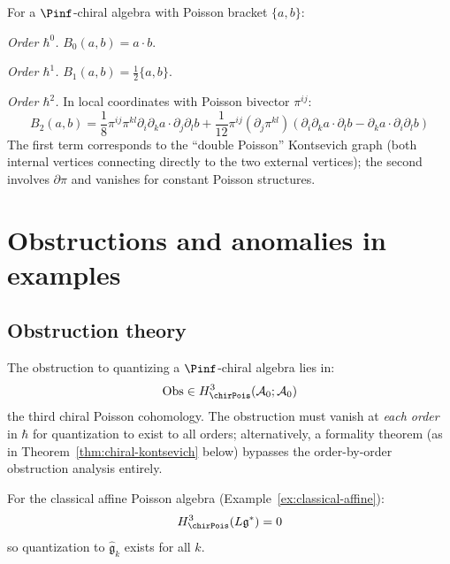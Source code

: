 \begin{computation}\label{comp:star-order-2}
For a $\Pinf$-chiral algebra with Poisson bracket $\{a, b\}$:

\emph{Order $\hbar^0$.} $B_0(a, b) = a \cdot b$.

\emph{Order $\hbar^1$.} $B_1(a, b) = \frac{1}{2}\{a, b\}$.

\emph{Order $\hbar^2$.}  In local coordinates with Poisson bivector $\pi^{ij}$:
\[
B_2(a, b) = \frac{1}{8}\pi^{ij}\pi^{kl}\partial_i\partial_k a \cdot \partial_j\partial_l b + \frac{1}{12}\pi^{ij}(\partial_j\pi^{kl})(\partial_i\partial_k a \cdot \partial_l b - \partial_k a \cdot \partial_i\partial_l b)
\]
The first term corresponds to the ``double Poisson'' Kontsevich graph (both internal vertices connecting directly to the two external vertices); the second involves $\partial\pi$ and vanishes for constant Poisson structures.
\end{computation}


\section{Obstructions and anomalies in examples}
\label{sec:obstructions}

\subsection{Obstruction theory}

\begin{theorem}\label{thm:obstructions}
The obstruction to quantizing a $\Pinf$-chiral algebra lies in:
\[
\mathrm{Obs} \in H^3_{\chirPois}(\mathcal{A}_0; \mathcal{A}_0)
\]
the third chiral Poisson cohomology.  The obstruction must vanish at
\emph{each order} in $\hbar$ for quantization to exist to all orders; alternatively,
a formality theorem (as in Theorem~\ref{thm:chiral-kontsevich} below) bypasses the
order-by-order obstruction analysis entirely.
\end{theorem}

\begin{example}\label{ex:no-obs-affine}
For the classical affine Poisson algebra (Example~\ref{ex:classical-affine}):
\[
H^3_{\chirPois}(L\mathfrak{g}^*) = 0
\]
so quantization to $\hat{\mathfrak{g}}_k$ exists for all $k$.
\end{example}

